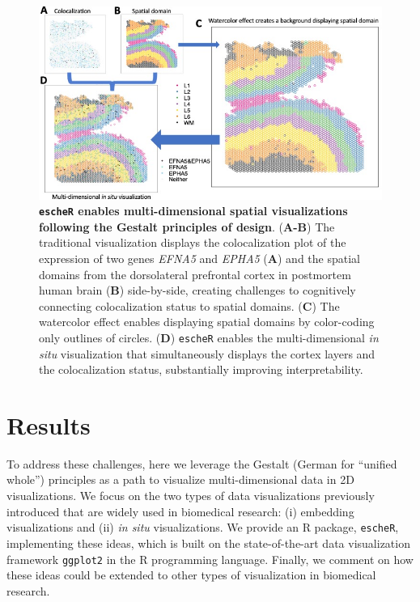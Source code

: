\documentclass[unnumsec,webpdf,modern,large,namedate]{oup-authoring-template}%
\theoremstyle{thmstyleone}%
\theoremstyle{thmstyletwo}%
\theoremstyle{thmstylethree}%
\begin{document}
\begin{figure}[!t]
\begin{center}
\includegraphics[width=\textwidth]{Manuscript/figure/insitu.jpg}
\caption{\small \textbf{\texttt{escheR} enables multi-dimensional spatial visualizations following the Gestalt principles of design}. (\textbf{A-B}) The traditional visualization displays the colocalization plot of the expression of two genes \textit{EFNA5} and \textit{EPHA5} (\textbf{A}) and the spatial domains from the dorsolateral prefrontal cortex in postmortem human brain \citep{huukimyers_2023} (\textbf{B}) side-by-side, creating challenges to cognitively connecting colocalization status to spatial domains. (\textbf{C}) The watercolor effect enables displaying spatial domains by color-coding only outlines of circles. (\textbf{D}) \texttt{escheR} enables the multi-dimensional \textit{in situ} visualization that simultaneously displays the cortex layers and the colocalization status, substantially improving interpretability.}
\label{fig:visual} 
\end{center}
\vspace{-0.3in}
\end{figure}



\section{Results}

To address these challenges, here we leverage the Gestalt (German for “unified whole”) principles \citep{todorovic_2008} as a path to visualize multi-dimensional data in 2D visualizations. We focus on the two types of data visualizations previously introduced that are widely used in biomedical research: (i) embedding visualizations and (ii) \textit{in situ} visualizations. We provide an R package, \texttt{escheR}, implementing these ideas, which is built on the state-of-the-art data visualization framework \texttt{ggplot2} in the R programming language. Finally, we comment on how these ideas could be extended to other types of visualization in biomedical research. 
\end{document}

